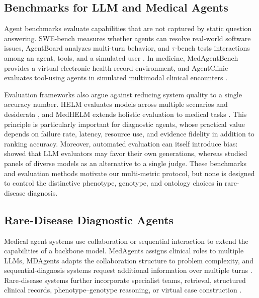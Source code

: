 \documentclass[letterpaper]{article} %
\begin{document}
\subsection{Benchmarks for LLM and Medical Agents}

Agent benchmarks evaluate capabilities that are not captured by static
question answering. SWE-bench measures whether agents can resolve real-world
software issues, AgentBoard analyzes multi-turn behavior, and
$\tau$-bench tests interactions among an agent, tools, and a simulated user
\citep{jimenez2024swebench,ma2024agentboard,yao2025taubench}. In medicine,
MedAgentBench provides a virtual electronic health record environment, and
AgentClinic evaluates tool-using agents in simulated multimodal clinical
encounters \citep{jiang2025medagentbench,schmidgall2026agentclinic}.

Evaluation frameworks also argue against reducing system quality to a single
accuracy number. HELM evaluates models across multiple scenarios and
desiderata \citep{liang2023helm}, and MedHELM extends holistic
evaluation to medical tasks \citep{bedi2026medhelm}. This principle is
particularly important for diagnostic agents, whose practical value depends
on failure rate, latency, resource use, and evidence fidelity in addition to
ranking accuracy. Moreover, automated evaluation can itself introduce bias:
\citet{panickssery2024selfpreference} showed that LLM evaluators may favor
their own generations, whereas \citet{verga2024juries} studied panels of
diverse models as an alternative to a single judge. These benchmarks and
evaluation methods motivate our multi-metric protocol, but none is designed
to control the distinctive phenotype, genotype, and ontology choices in
rare-disease diagnosis.

\subsection{Rare-Disease Diagnostic Agents}

Medical agent systems use collaboration or sequential interaction to extend
the capabilities of a backbone model. MedAgents assigns clinical roles to
multiple LLMs, MDAgents adapts the collaboration structure to problem
complexity, and sequential-diagnosis systems request additional information
over multiple turns
\citep{tang2024medagents,kim2024mdagents,nori2025sequential}. Rare-disease
systems further incorporate specialist teams, retrieval, structured clinical
records, phenotype--genotype reasoning, or virtual case construction
\citep{chen2026rareagents,zhao2026deeprare,wu2025rdma,
liu2026vcrdagent}.
\end{document}
